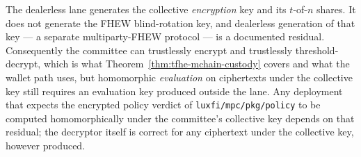 \begin{remark}
\label{rem:tfhe-lane-scope}
The dealerless lane generates the collective \emph{encryption} key and its
$t$-of-$n$ shares. It does not generate the FHEW blind-rotation key, and
dealerless generation of that key --- a separate multiparty-FHEW protocol ---
is a documented residual. Consequently the committee can trustlessly encrypt
and trustlessly threshold-decrypt, which is what
Theorem~\ref{thm:tfhe-mchain-custody} covers and what the wallet path uses, but
homomorphic \emph{evaluation} on ciphertexts under the collective key still
requires an evaluation key produced outside the lane. Any deployment that
expects the encrypted policy verdict of
\texttt{luxfi/mpc/pkg/policy} to be computed homomorphically under the
committee's collective key depends on that residual; the decryptor itself is
correct for any ciphertext under the collective key, however produced.
\end{remark}
